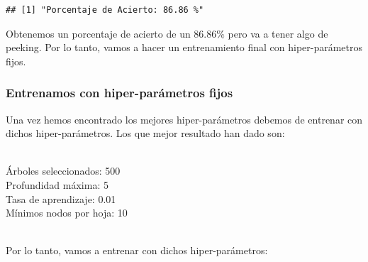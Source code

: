 \documentclass[
]{article}
\newenvironment{Shaded}{\begin{snugshade}}{\end{snugshade}}
\newcommand{\CommentTok}[1]{\textcolor[rgb]{0.56,0.35,0.01}{\textit{#1}}}
\newcommand{\DecValTok}[1]{\textcolor[rgb]{0.00,0.00,0.81}{#1}}
\newcommand{\FloatTok}[1]{\textcolor[rgb]{0.00,0.00,0.81}{#1}}
\newcommand{\FunctionTok}[1]{\textcolor[rgb]{0.13,0.29,0.53}{\textbf{#1}}}
\newcommand{\NormalTok}[1]{#1}
\newcommand{\OtherTok}[1]{\textcolor[rgb]{0.56,0.35,0.01}{#1}}
\newcommand{\SpecialCharTok}[1]{\textcolor[rgb]{0.81,0.36,0.00}{\textbf{#1}}}
\newcommand{\StringTok}[1]{\textcolor[rgb]{0.31,0.60,0.02}{#1}}
\begin{document}
\begin{Shaded}
\end{Shaded}

\begin{verbatim}
## [1] "Porcentaje de Acierto: 86.86 %"
\end{verbatim}

Obtenemos un porcentaje de acierto de un 86.86\% pero va a tener algo de
peeking. Por lo tanto, vamos a hacer un entrenamiento final con
hiper-parámetros fijos.

\hypertarget{entrenamos-con-hiper-paruxe1metros-fijos}{%
\subsubsection{Entrenamos con hiper-parámetros
fijos}\label{entrenamos-con-hiper-paruxe1metros-fijos}}

Una vez hemos encontrado los mejores hiper-parámetros debemos de
entrenar con dichos hiper-parámetros. Los que mejor resultado han dado
son:\\
\strut \\
Árboles seleccionados: 500\\
Profundidad máxima: 5\\
Tasa de aprendizaje: 0.01\\
Mínimos nodos por hoja: 10\\
\strut \\
Por lo tanto, vamos a entrenar con dichos hiper-parámetros:
\end{document}
